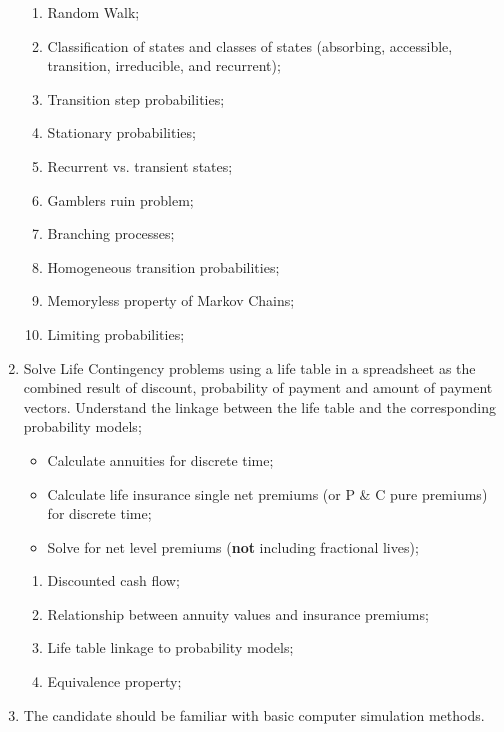 \begin{outcomes}
\begin{enumerate}
\begin{itemize}
		\end{itemize}
	\begin{knowledge}
	\begin{enumerate}[label = \alph*.]
		\item	Random Walk;
		\item	Classification of states and classes of states (absorbing, accessible, transition, irreducible, and recurrent);
		\item	Transition step probabilities;
		\item	Stationary probabilities;
		\item	Recurrent vs. transient states;
		\item	Gamblers ruin problem;
		\item	Branching processes;
		\item	Homogeneous transition probabilities;
		\item	Memoryless property of Markov Chains;
		\item	Limiting probabilities;
	\end{enumerate}
	\end{knowledge}
\tcbline
	\item	Solve Life Contingency problems using a life table in a spreadsheet as the combined result of discount, probability of payment and amount of payment vectors. Understand the linkage between the life table and the corresponding probability models;
		\begin{itemize}
		\item	Calculate annuities for discrete time;
		\item	Calculate life insurance single net premiums (or P \& C pure premiums) for discrete time;
		\item	Solve for net level premiums (\textbf{not} including fractional lives);
		\end{itemize}
	\begin{knowledge}
	\begin{enumerate}[label = \alph*.]
		\item	Discounted cash flow;
		\item	Relationship between annuity values and insurance premiums;
		\item	Life table linkage to probability models;
		\item	Equivalence property;
	\end{enumerate}
	\end{knowledge}
\tcbline
	\item	The candidate should be familiar with basic computer simulation methods.

\end{enumerate}
\end{outcomes}
